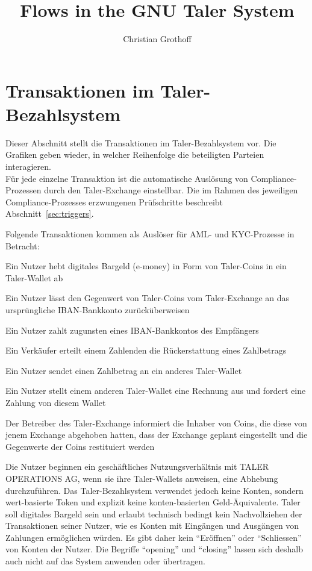 \documentclass[10pt,a4paper,oneside]{book}
\author{Christian Grothoff}
\title{Flows in the GNU Taler System}
\begin{document}
\tableofcontents

\newcommand\TALER{TALER OPERATIONS AG}
\newcommand\CURRENCY{CHF}
\newcommand\LAND{der Schweiz}

\section{Transaktionen im Taler-Bezahlsystem}\label{sec:Transaktionen}

Dieser Abschnitt stellt die Transaktionen im Taler-Bezahlsystem
vor. Die Grafiken geben wieder, in welcher Reihenfolge die beteiligten
Parteien interagieren. \\
F\"ur jede einzelne Transaktion ist die automatische Ausl\"osung von
Compliance-Prozessen durch den Taler-Exchange einstellbar.
Die im Rahmen des jeweiligen Compliance-Prozesses erzwungenen
Pr\"ufschritte beschreibt Abschnitt~\ref{sec:triggers}.

Folgende Transaktionen kommen als Ausl\"oser f\"ur AML- und KYC-Prozesse
in Betracht:
\begin{description}[noitemsep]
  \item[withdraw] Ein Nutzer hebt digitales Bargeld (e-money) in Form von
  Taler-Coins in ein Taler-Wallet ab
  \item[reimburse] Ein Nutzer l\"asst den Gegenwert von Taler-Coins vom
  Taler-Exchange an das urspr\"ungliche IBAN-Bankkonto zur\"uck\"uberweisen
  \item[pay] Ein Nutzer zahlt zugunsten eines IBAN-Bankkontos des Empf\"angers
  \item[refund] Ein Verk\"aufer erteilt einem Zahlenden die R\"uckerstattung
  eines Zahlbetrags
  \item[push] Ein Nutzer sendet einen Zahlbetrag an ein anderes Taler-Wallet
  \item[pull] Ein Nutzer stellt einem anderen Taler-Wallet eine Rechnung aus
  und fordert eine Zahlung von diesem Wallet
  \item[shutdown] Der Betreiber des Taler-Exchange informiert die Inhaber von
  Coins, die diese von jenem Exchange abgehoben hatten, dass der Exchange
  geplant eingestellt und die Gegenwerte der Coins restituiert werden
\end{description}

Die Nutzer beginnen ein gesch\"aftliches Nutzungsverh\"altnis mit
\TALER{}, wenn sie ihre Taler-Wallets anweisen, eine Abhebung durchzuf\"uhren.
Das Taler-Bezahlsystem verwendet jedoch keine Konten, sondern wert-basierte
Token und explizit keine konten-basierten Geld-\"Aquivalente.
Taler soll digitales Bargeld sein und erlaubt technisch bedingt
kein Nachvollziehen der Transaktionen seiner Nutzer, wie es Konten mit
Eing\"angen und Ausg\"angen von Zahlungen erm\"oglichen w\"urden.
Es gibt daher kein ``Er\"offnen'' oder ``Schliessen'' von Konten der Nutzer.
Die Begriffe ``opening'' und ``closing'' lassen sich deshalb auch nicht auf
das System anwenden oder \"ubertragen. \\
\end{document}
